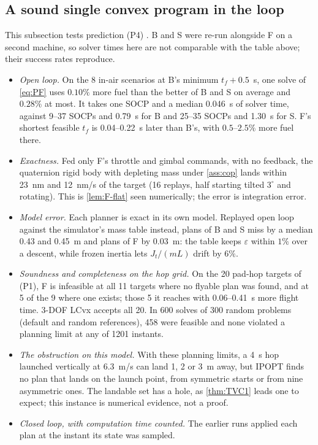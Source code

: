 \subsection{A sound single convex program in the loop}\label{sec:practiceF}
This subsection tests prediction (P4) . B and S were re-run alongside F on a second machine, so solver
times here are not comparable with the table above; their success rates reproduce.
\begin{itemize}[leftmargin=*,itemsep=2pt]
\item \emph{Open loop.} On the 8 in-air scenarios at B's minimum $t_f+0.5$~s, one solve of \eqref{eq:PF} uses $0.10\%$ more fuel than the
better of B and S on average and $0.28\%$ at most. It takes one SOCP and a median 0.046~s of solver time, against 9--37 SOCPs and
0.79~s for B and 25--35 SOCPs and 1.30~s for S. F's shortest feasible $t_f$ is 0.04--0.22~s later than B's, with $0.5$--$2.5\%$ more
fuel there.
\item \emph{Exactness.} Fed only F's throttle and gimbal commands, with no feedback, the quaternion rigid body with depleting mass
under \cref{ass:cop} lands within 23~nm and 12~nm/s of the target (16 replays, half starting tilted $3^\circ$ and rotating). This is
\cref{lem:F-flat} seen numerically; the error is integration error.
\item \emph{Model error.} Each planner is exact in its own model. Replayed open loop against the simulator's mass table instead, plans
of B and S miss by a median 0.43 and 0.45~m and plans of F by 0.03~m: the table keeps $\varepsilon$ within $1\%$ over a descent, while
frozen inertia lets $J_t/(mL)$ drift by $6\%$.
\item \emph{Soundness and completeness on the hop grid.} On the 20 pad-hop targets of (P1), F is infeasible at all 11 targets where no
flyable plan was found, and at 5 of the 9 where one exists; those 5 it reaches with 0.06--0.41~s more flight time. 3-DOF LCvx accepts
all 20. In 600 solves of 300 random problems (default and random references), 458 were feasible and none violated a planning limit at
any of 1201 instants.
\item \emph{The obstruction on this model.} With these planning limits, a 4~s hop launched vertically at 6.3~m/s can land 1, 2 or
3~m away, but IPOPT finds no plan that lands on the launch point, from symmetric starts or from nine asymmetric ones. The landable
set has a hole, as \cref{thm:TVC1} leads one to expect; this instance is numerical evidence, not a proof.
\item \emph{Closed loop, with computation time counted.} The earlier runs applied each plan at the instant its state was sampled.

\end{itemize}
